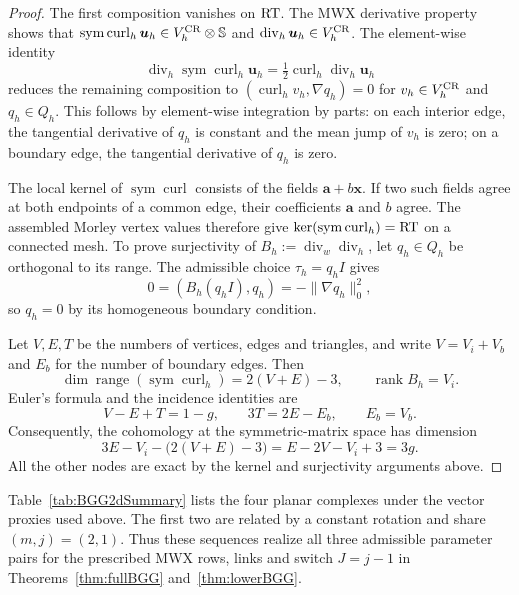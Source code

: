 \documentclass[10pt]{amsart}
\numberwithin{equation}{section}
\newcommand{\curl}{\operatorname{curl}}
\renewcommand{\div}{\operatorname{div}}
\newcommand{\sym}{\operatorname{sym}}
\begin{document}
\begin{proof}
The first composition vanishes on ${\rm RT}$. The MWX derivative property
shows that $\sym\curl_h\boldsymbol u_h\in V_h^{\rm CR}\otimes\mathbb S$
and $\div_h\boldsymbol u_h\in V_h^{\rm CR}$.
The element-wise identity
\[
\div_h\sym\curl_h\boldsymbol u_h
=\tfrac12\curl_h\div_h\boldsymbol u_h
\]
reduces the remaining composition to
$(\curl_h v_h,\nabla q_h)=0$ for $v_h\in V_h^{\rm CR}$ and $q_h\in Q_h$.
This follows by element-wise integration by parts: on each interior edge,
the tangential derivative of $q_h$ is constant and the mean jump of $v_h$
is zero; on a boundary edge, the tangential derivative of $q_h$ is zero.

The local kernel of $\sym\curl$ consists of the fields
$\boldsymbol a+b\boldsymbol x$. If two such fields agree at both endpoints
of a common edge, their coefficients $\boldsymbol a$ and $b$ agree.
The assembled Morley vertex values therefore give
$\ker(\sym\curl_h)={\rm RT}$ on a connected mesh.
To prove surjectivity of $B_h:=\div_w\div_h$, let $q_h\in Q_h$ be
orthogonal to its range. The admissible choice $\tau_h=q_hI$ gives
\[
0=(B_h(q_hI),q_h)=-\|\nabla q_h\|_0^2,
\]
so $q_h=0$ by its homogeneous boundary condition.

Let $V,E,T$ be the numbers of vertices, edges and triangles, and write
$V=V_i+V_b$ and $E_b$ for the number of boundary edges. Then
\[
\dim\operatorname{range}(\sym\curl_h)=2(V+E)-3,
\qquad \operatorname{rank}B_h=V_i.
\]
Euler's formula and the incidence identities are
\[
V-E+T=1-g,\qquad 3T=2E-E_b,\qquad E_b=V_b.
\]
Consequently, the cohomology at the symmetric-matrix space has dimension
\[
3E-V_i-\bigl(2(V+E)-3\bigr)
=E-2V-V_i+3=3g.
\]
All the other nodes are exact by the kernel and surjectivity arguments above.
\end{proof}


Table~\ref{tab:BGG2dSummary} lists the four planar complexes under the
vector proxies used above. The first two are related by a constant
rotation and share $(m,j)=(2,1)$. Thus these sequences realize all three
admissible parameter pairs for the prescribed MWX rows, links and switch
$J=j-1$ in Theorems~\ref{thm:fullBGG} and~\ref{thm:lowerBGG}.
\end{document}
